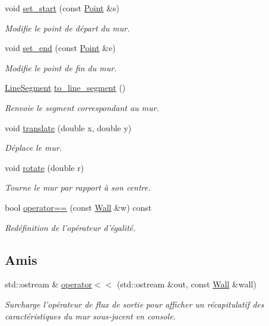 \begin{DoxyCompactItemize}
\item 
void \hyperlink{classWall_ad11150d7394e06447a697c4e79d47543}{set\+\_\+start} (const \hyperlink{classPoint}{Point} \&s)
\begin{DoxyCompactList}\small\item\em Modifie le point de départ du mur. \end{DoxyCompactList}\item 
void \hyperlink{classWall_a603f23dd306b50d9b2724f83beb61d62}{set\+\_\+end} (const \hyperlink{classPoint}{Point} \&e)
\begin{DoxyCompactList}\small\item\em Modifie le point de fin du mur. \end{DoxyCompactList}\item 
\hyperlink{classLineSegment}{Line\+Segment} \hyperlink{classWall_acb8c8b99d772ce94bf8ef4b249c32fd2}{to\+\_\+line\+\_\+segment} ()
\begin{DoxyCompactList}\small\item\em Renvoie le segment correspondant au mur. \end{DoxyCompactList}\item 
void \hyperlink{classWall_ab9f0416a2272041583bb261345963eed}{translate} (double x, double y)
\begin{DoxyCompactList}\small\item\em Déplace le mur. \end{DoxyCompactList}\item 
void \hyperlink{classWall_ab9ae9b0409c9b88c0d4b156c4e5ee5f5}{rotate} (double r)
\begin{DoxyCompactList}\small\item\em Tourne le mur par rapport à son centre. \end{DoxyCompactList}\item 
bool \hyperlink{classWall_adae0f86f9cef482e5f937fffdd17711d}{operator==} (const \hyperlink{classWall}{Wall} \&w) const 
\begin{DoxyCompactList}\small\item\em Redéfinition de l'opérateur d'égalité. \end{DoxyCompactList}\end{DoxyCompactItemize}
\subsection*{Amis}
\begin{DoxyCompactItemize}
\item 
std\+::ostream \& \hyperlink{classWall_a971cae1df191c5ccfd2ef1f6454a6d11}{operator$<$$<$} (std\+::ostream \&out, const \hyperlink{classWall}{Wall} \&wall)
\begin{DoxyCompactList}\small\item\em Surcharge l'opérateur de flux de sortie pour afficher un récapitulatif des caractéristiques du mur sous-\/jacent en console. \end{DoxyCompactList}\end{DoxyCompactItemize}
